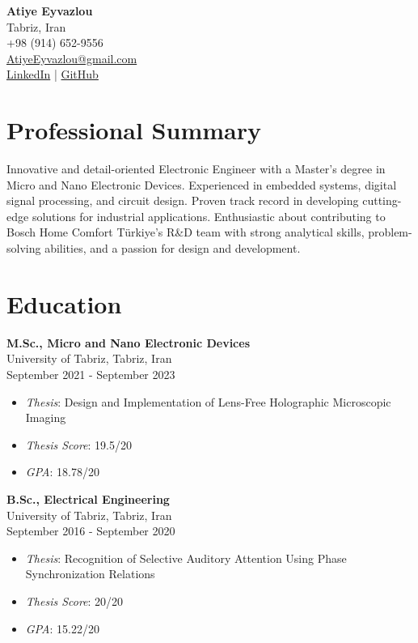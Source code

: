 \documentclass[a4paper,10pt]{article}
\begin{document}
\begin{center}
    {\LARGE \textbf{Atiye Eyvazlou}} \\
    Tabriz, Iran \\
    +98 (914) 652-9556 \\
    \href{mailto:AtiyeEyvazlou@gmail.com}{AtiyeEyvazlou@gmail.com} \\
    \href{https://www.linkedin.com/in/atiyeh-eyvazlou-52290b173/}{LinkedIn} | \href{https://github.com/AtiyeEyvazlou}{GitHub}
\end{center}

\vspace{0.5cm}

\section{Professional Summary}
Innovative and detail-oriented Electronic Engineer with a Master's degree in Micro and Nano Electronic Devices. Experienced in embedded systems, digital signal processing, and circuit design. Proven track record in developing cutting-edge solutions for industrial applications. Enthusiastic about contributing to Bosch Home Comfort Türkiye's R&D team with strong analytical skills, problem-solving abilities, and a passion for design and development.

\section{Education}
\textbf{M.Sc., Micro and Nano Electronic Devices} \\
University of Tabriz, Tabriz, Iran \\
September 2021 - September 2023 \\
\begin{itemize}[noitemsep,topsep=0pt,parsep=0pt,partopsep=0pt]
    \item \textit{Thesis}: Design and Implementation of Lens-Free Holographic Microscopic Imaging
    \item \textit{Thesis Score}: 19.5/20
    \item \textit{GPA}: 18.78/20
\end{itemize}

\textbf{B.Sc., Electrical Engineering} \\
University of Tabriz, Tabriz, Iran \\
September 2016 - September 2020 \\
\begin{itemize}[noitemsep,topsep=0pt,parsep=0pt,partopsep=0pt]
    \item \textit{Thesis}: Recognition of Selective Auditory Attention Using Phase Synchronization Relations
    \item \textit{Thesis Score}: 20/20
    \item \textit{GPA}: 15.22/20
\end{itemize}
\end{document}

